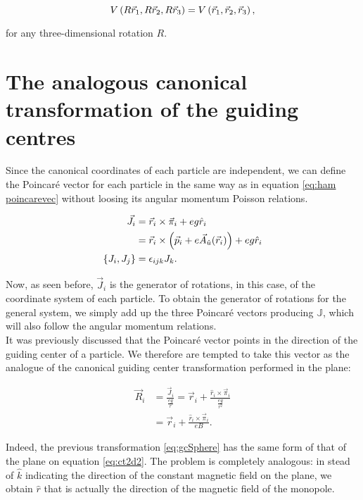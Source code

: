 \begin{equation*}
 V\left( R\vec{r}_1,R\vec{r}_2,R\vec{r}_3 \right) =  V\left( \vec{r}_1,\vec{r}_2,\vec{r}_3 \right),
\end{equation*}

for any three-dimensional rotation $R$.\\

\section{The analogous canonical transformation of the guiding centres}
Since the canonical coordinates of each particle are independent, we can define the Poincar\'e vector for each particle in the same way as in equation \eqref{eq:ham poincarevec} without loosing its angular momentum Poisson relations.

\begin{align*}
\vec{J}_i &= \vec{r}_i\times\vec{\pi}_i + eg\hat{r}_i\\
&= \vec{r}_i\times\left( \vec{p}_i+e\vec{A}_{\hat{u}}(\vec{r}_i) \right) + eg\hat{r}_i\\
\left\lbrace J_i, J_j \right\rbrace &= \epsilon_{ijk}J_k.
\end{align*}

Now, as seen before, $\vec{J}_i$ is the generator of rotations, in this case, of the coordinate system of each particle. To obtain the generator of rotations for the general system, we simply add up the three Poincar\'e vectors producing $\mathbb{J}$, which will also follow the angular momentum relations.\\

It was previously discussed that the Poincar\'e vector points in the direction of the guiding center of a particle. We therefore are tempted to take this vector as the analogue of the canonical guiding center transformation performed in the plane:

\begin{align}
\vec{R}_i &= \frac{\vec{J}_i}{\frac{eg}{r}} = \vec{r}_i + \frac{\hat{r}_i\times\vec{\pi}_i}{\frac{eg}{r^2}} \nonumber\\
&= \vec{r}_i + \frac{\hat{r}_i\times\vec{\pi}_i}{eB}.
\label{eq:gcSphere}
\end{align}

Indeed, the previous transformation \eqref{eq:gcSphere} has the same form of that of the plane on equation \eqref{eq:ct2d2}. The problem is completely analogous: in stead of $\hat{k}$ indicating the direction of the constant magnetic field on the plane, we obtain $\hat{r}$ that is actually the direction of the magnetic field of the monopole. \\

